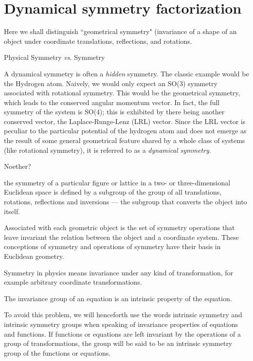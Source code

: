 \section{Dynamical symmetry factorization}
\label{sect:DynSymmFact}

Here we shall distinguish ``geometrical symmetry"
(invariance of a shape of an object under coordinate translations, reflections,
and rotations.


Physical Symmetry {\em vs.}  Symmetry

A dynamical symmetry is often a {\em hidden} symmetry. The classic
example would be the Hydrogen atom. Naively, we would only expect an
SO(3) symmetry associated with rotational symmetry. This would be the
geometrical symmetry, which leads to the conserved angular momentum
vector. In fact, the full symmetry of the system is SO(4); this is
exhibited by there being another conserved vector, the Laplace-Runge-Lenz
(LRL) vector. Since the LRL vector is peculiar to the particular
potential of the hydrogen atom and does not emerge as the result of some
general geometrical feature shared by a whole class of systems (like
rotational symmetry), it is referred to as a \emph{dynamical symmetry}.

Noether?

the symmetry of a particular figure or lattice
in a two- or three-dimensional Euclidean space is defined by a subgroup of
the group of all translations, rotations, reflections and inversions — the
subgroup that converts the object into itself.

Associated with each geometric
object is the set of symmetry operations that leave invariant the relation
between the object and a coordinate system.
These conceptions of symmetry and operations of symmetry have their
basis in Euclidean geometry.

Symmetry in physics means invariance under any
kind of transformation, for example arbitrary coordinate transformations.

The invariance group of an equation is an intrinsic property of the equation.

To avoid this problem, we will henceforth use the words intrinsic symmetry
and intrinsic symmetry groups when speaking of invariance properties of
equations and functions. If functions or equations are left invariant by the
operations of a group of transformations, the group will be said to be an
intrinsic symmetry group of the functions or equations.

